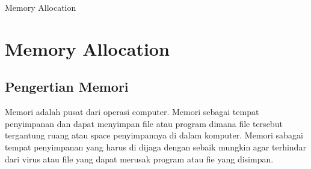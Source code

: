
Memory Allocation

\section {Memory Allocation}

\subsection {Pengertian Memori}

Memori adalah pusat dari operasi computer. Memori sebagai tempat penyimpanan dan dapat menyimpan file atau program dimana file tersebut tergantung ruang atau space penyimpannya di dalam komputer. Memori sabagai tempat penyimpanan yang harus di dijaga dengan sebaik mungkin agar terhindar dari virus atau file yang dapat merusak program atau fie yang disimpan.
